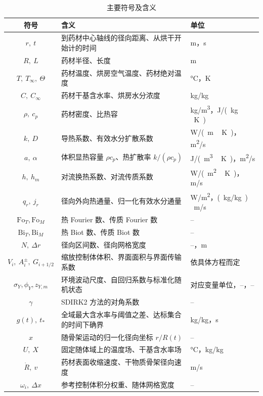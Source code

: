 \documentclass[withoutpreface,bwprint]{cumcmthesis}
\begin{document}
\begin{table}[H]
\centering
\caption{主要符号及含义}
\label{tab:symbols}
{\small
\begin{tabular}{cp{}p{}}
\toprule[1.2pt]
符号 & 含义 & 单位 \\
\midrule
$r,\ t$ & 到药材中心轴线的径向距离、从烘干开始计的时间 & \si{m}，\si{s} \\
$R,\ L$ & 药材半径、长度 & \si{m} \\
$T,\ T_\infty,\ \Theta$ & 药材温度、烘房空气温度、药材绝对温度 & \si{\celsius}，\si{K} \\
$C,\ C_\infty$ & 药材干基含水率、烘房水分浓度 & \si{kg/kg} \\
$\rho,\ c_p$ & 药材密度、比热容 & \si{kg/m^3}，\si{J/(kg\,K)} \\
$k,\ D$ & 导热系数、有效水分扩散系数 & \si{W/(m\,K)}，\si{m^2/s} \\
$a,\ \alpha$ & 体积显热容量 $\rho c_p$、热扩散率 $k/(\rho c_p)$ & \si{J/(m^3\,K)}，\si{m^2/s} \\
$h,\ h_m$ & 对流换热系数、对流传质系数 & \si{W/(m^2\,K)}，\si{m/s} \\
$q_r,\ j_r$ & 径向外向热通量、归一化有效水分通量 & \si{W/m^2}，\si{(kg/kg)\,m/s} \\
$\mathrm{Fo}_T,\mathrm{Fo}_M$ & 热 Fourier 数、传质 Fourier 数 & -- \\
$\mathrm{Bi}_T,\mathrm{Bi}_M$ & 热 Biot 数、传质 Biot 数 & -- \\
$N,\ \Delta r$ & 径向区间数、径向网格宽度 & --，\si{m} \\
$V_i,\ A_i^{\pm},\ G_{i+1/2}$ & 缩放控制体体积、界面面积与界面传输系数 & 依具体方程而定 \\
$\sigma_Y,\phi_Y,z_{Y,m}$ & 环境波动尺度、自回归系数与标准化随机状态 & 对应变量单位，--，-- \\
$\gamma$ & SDIRK2 方法的对角系数 & -- \\
$g(t),\ t_*$ & 全域最大含水率与阈值之差、达标集合的时间下确界 & \si{kg/kg}，\si{s} \\
$x$ & 随骨架运动的归一化径向坐标 $r/R(t)$ & -- \\
$U,\ X$ & 固定随体域上的温度场、干基含水率场 & \si{\celsius}，\si{kg/kg} \\
$\dot R,\ v$ & 药材表面收缩速度、干物质骨架径向速度 & \si{m/s} \\
$\omega_i,\ \Delta x$ & 参考控制体积分权重、随体网格宽度 & -- \\
\bottomrule[1.2pt]
\end{tabular}}
\end{table}
\end{document}
